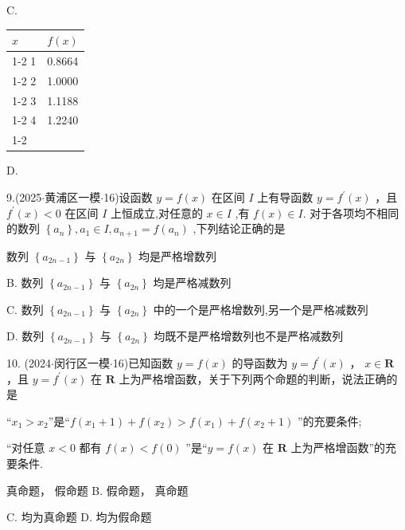 C.

\begin{center}

\begin{tabular}{|p{4cm}|p{12cm}|}
\hline
$x$ & $f\left( x\right)$ \\
\cline{1-2}
1 & 0.8664 \\
\cline{1-2}
2 & 1.0000 \\
\cline{1-2}
3 & 1.1188 \\
\cline{1-2}
4 & 1.2240 \\
\cline{1-2}
\hline
\end{tabular}
\end{center}

D.

9.(2025$\cdot$黄浦区一模$\cdot$16)设函数 $y = f\left( x\right)$ 在区间 $I$ 上有导函数 $y = {f}^{\prime }\left( x\right)$ ，且 ${f}^{\prime }\left( x\right)  < 0$ 在区间 $I$ 上恒成立,对任意的 $x \in  I$ ,有 $f\left( x\right)  \in  I$. 对于各项均不相同的数列 $\left\{  {a}_{n}\right\}  ,{a}_{1} \in  I,{a}_{n + 1} = f\left( {a}_{n}\right)$ ,下列结论正确的是 \dotfill{(\kh{})}

\xx{}{}{}{}数列 $\left\{  {a}_{{2n} - 1}\right\}$ 与 $\left\{  {a}_{2n}\right\}$ 均是严格增数列

B. 数列 $\left\{  {a}_{{2n} - 1}\right\}$ 与 $\left\{  {a}_{2n}\right\}$ 均是严格减数列

C. 数列 $\left\{  {a}_{{2n} - 1}\right\}$ 与 $\left\{  {a}_{2n}\right\}$ 中的一个是严格增数列,另一个是严格减数列

D. 数列 $\left\{  {a}_{{2n} - 1}\right\}$ 与 $\left\{  {a}_{2n}\right\}$ 均既不是严格增数列也不是严格减数列

10. (2024$\cdot$闵行区一模$\cdot$16)已知函数 $y = f\left( x\right)$ 的导函数为 $y = {f}^{\prime }\left( x\right)$ ， $x \in  \mathbf{R}$ ，且 $y = {f}^{\prime }\left( x\right)$ 在 $\mathbf{R}$ 上为严格增函数，关于下列两个命题的判断，说法正确的是 \dotfill{(\kh{})}

  “${x}_{1} > {x}_{2}$”是“$f\left( {{x}_{1} + 1}\right)  + f\left( {x}_{2}\right)  > f\left( {x}_{1}\right)  + f\left( {{x}_{2} + 1}\right)$ ”的充要条件;

   “对任意 $x < 0$ 都有 $f\left( x\right)  < f\left( 0\right)$ ”是“$y = f\left( x\right)$ 在 $\mathbf{R}$ 上为严格增函数”的充要条件.

\xx{}{}{}{}  真命题，  假命题 B.   假命题，  真命题

C.     均为真命题 D.     均为假命题

